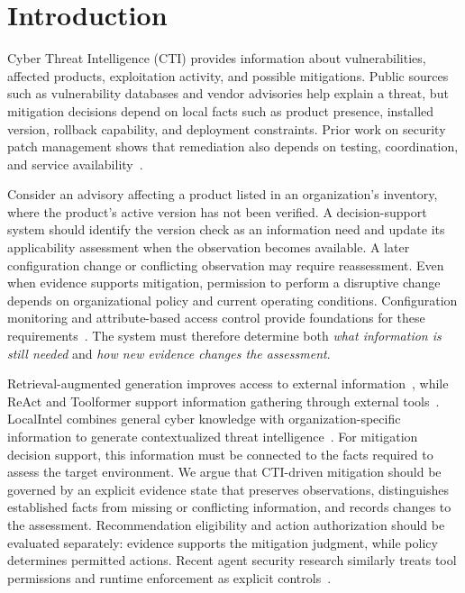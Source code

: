 \documentclass[conference]{IEEEtran}
\begin{document}
\section{Introduction}

Cyber Threat Intelligence (CTI) provides information about
vulnerabilities, affected products, exploitation activity, and possible
mitigations. Public sources such as vulnerability databases and vendor
advisories help explain a threat, but mitigation decisions depend on
local facts such as product presence, installed version, rollback
capability, and deployment constraints. Prior work on security patch
management shows that remediation also depends on testing, coordination,
and service availability~\cite{dissanayake2022automation,jenkins2024patching,souppaya2022patchmanagement}.

Consider an advisory affecting a product listed in an organization's
inventory, where the product's active version has not been verified. A decision-support
system should identify the version check as an information need and
update its applicability assessment when the observation becomes
available. A later configuration change or conflicting observation may
require reassessment. Even when evidence supports mitigation, permission
to perform a disruptive change depends on organizational policy and
current operating conditions. Configuration monitoring and
attribute-based access control provide foundations for these
requirements~\cite{johnson2011configuration,dempsey2011monitoring,hu2014abac}.
The system must therefore determine both \emph{what information is
still needed} and \emph{how new evidence changes the assessment}.

Retrieval-augmented generation improves access to external
information~\cite{lewis2020rag}, while ReAct and Toolformer support
information gathering through external
tools~\cite{yao2023react,schick2023toolformer}. LocalIntel combines
general cyber knowledge with organization-specific information to
generate contextualized threat intelligence~\cite{mitra2024localintel}.
For mitigation decision support, this information must be connected
to the facts required to assess the target environment. We argue that
CTI-driven mitigation should be governed by an explicit evidence state
that preserves observations, distinguishes established facts from
missing or conflicting information, and records changes to the
assessment. Recommendation eligibility and action authorization should
be evaluated separately: evidence supports the mitigation judgment,
while policy determines permitted actions. Recent agent security
research similarly treats tool permissions and runtime enforcement
as explicit controls~\cite{shi2025progent,wang2026agentspec}.
\end{document}
